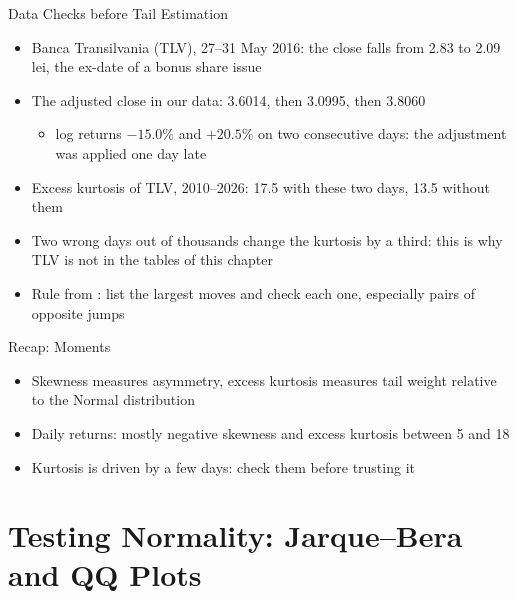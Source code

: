 \begin{frame}{Data Checks before Tail Estimation}
\itemsize{\footnotesize}
\begin{itemize}
    \item Banca Transilvania (TLV), 27--31 May 2016: the close falls from 2.83 to 2.09 lei, the ex-date of a bonus share issue
    \item The adjusted close in our data: 3.6014, then 3.0995, then 3.8060
    \begin{itemize}
        \item log returns $-15.0\%$ and $+20.5\%$ on two consecutive days: the adjustment was applied one day late
    \end{itemize}
    \item Excess kurtosis of TLV, 2010--2026: 17.5 with these two days, 13.5 without them
    \item Two wrong days out of thousands change the kurtosis by a third: this is why TLV is not in the tables of this chapter
    \item Rule from : list the largest moves and check each one, especially pairs of opposite jumps
\end{itemize}
\end{frame}

\begin{frame}{Recap: Moments}
\itemsize{\small}
\begin{itemize}
    \item Skewness measures asymmetry, excess kurtosis measures tail weight relative to the Normal distribution
    \item Daily returns: mostly negative skewness and excess kurtosis between 5 and 18
    \item Kurtosis is driven by a few days: check them before trusting it
\end{itemize}
\end{frame}


\section{Testing Normality: Jarque--Bera and QQ Plots}

